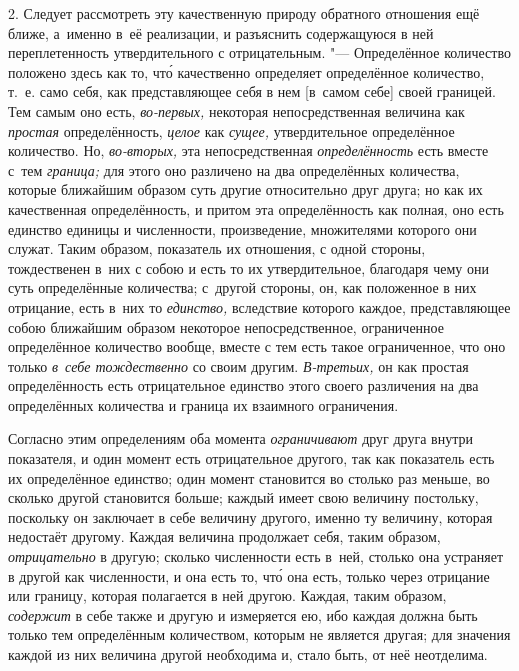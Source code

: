 2. Следует рассмотреть эту качественную природу обратного отношения ещё ближе,
а~именно в~её реализации, и разъяснить содержащуюся в ней переплетенность
утвердительного с отрицательным. "--- Определённое количество положено здесь
как то, чт\'{о} качественно определяет определённое количество, т.~е. само
себя, как представляющее себя в нем [в~самом себе] своей границей. Тем самым
оно есть, {\em во-первых,} некоторая непосредственная величина как
{\em простая} определённость, {\em целое} как {\em сущее,} утвердительное
определённое количество. Но, {\em во-вторых,} эта непосредственная
{\em определённость} есть вместе с~тем {\em граница;} для этого оно различено
на два определённых количества, которые ближайшим образом суть другие
относительно друг друга; но как их качественная определённость, и притом эта
определённость как полная, оно есть единство единицы и численности,
произведение, множителями которого они служат. Таким образом, показатель их
отношения, с одной стороны, тождественен в~них с собою и есть то их
утвердительное, благодаря чему они суть определённые количества; с~другой
стороны, он, как положенное в них отрицание, есть в~них то {\em единство,}
вследствие которого каждое, представляющее собою ближайшим образом некоторое
непосредственное, ограниченное определённое количество вообще, вместе с тем
есть такое ограниченное, что оно только {\em в~себе тождественно} со своим
другим. {\em В-третьих,} он как простая определённость есть отрицательное
единство этого своего различения на два определённых количества и граница их
взаимного ограничения.

Согласно этим определениям оба момента {\em ограничивают} друг друга внутри
показателя, и один момент есть отрицательное другого, так как показатель есть
их определённое единство; один момент становится во столько раз меньше, во
сколько другой становится больше; каждый имеет свою величину постольку,
поскольку он заключает в себе величину другого, именно ту величину, которая
недостаёт другому. Каждая величина продолжает себя, таким образом,
{\em отрицательно} в другую; сколько численности есть в~ней, столько она
устраняет в другой как численности, и она есть то, чт\'{о} она есть, только
через отрицание или границу, которая полагается в ней другою. Каждая, таким
образом, {\em содержит} в себе также и другую и измеряется ею, ибо каждая
должна быть только тем определённым количеством, которым не является другая;
для значения каждой из них величина другой необходима и, стало быть, от неё
неотделима.

